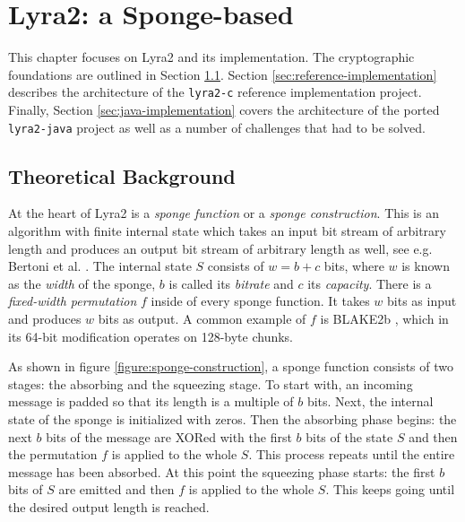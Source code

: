 \chapter{Lyra2: a Sponge-based }
\label{sec:implementation-details}
\label{chapter:lyra2}

This chapter focuses on Lyra2 and its implementation. The cryptographic foundations are outlined in Section \ref{sec:lyra2-brief-description}. Section \ref{sec:reference-implementation} describes the architecture of the \texttt{lyra2-c} reference implementation project. Finally, Section \ref{sec:java-implementation} covers the architecture of the ported \texttt{lyra2-java} project as well as a number of challenges that had to be solved.

\section{Theoretical Background}
\label{sec:lyra2-brief-description}

At the heart of Lyra2 is a \emph{sponge function} or a \emph{sponge construction}. This is an algorithm with finite internal state which takes an input bit stream of arbitrary length and produces an output bit stream of arbitrary length as well, see e.g. Bertoni et al. \cite{bertoni2007sponge}. The internal state \(S\) consists of \(w = b + c\) bits, where \(w\) is known as the \emph{width} of the sponge, \(b\) is called its \emph{bitrate} and \(c\) its \emph{capacity}. There is a \emph{fixed-width permutation} \(f\) inside of every sponge function. It takes \(w\) bits as input and produces \(w\) bits as output. A common example of \(f\) is BLAKE2b \cite{aumasson:2013:blake2}, which in its 64-bit modification operates on 128-byte chunks.

As shown in figure \ref{figure:sponge-construction}, a sponge function consists of two stages: the absorbing and the squeezing stage. To start with, an incoming message is padded so that its length is a multiple of \(b\) bits. Next, the internal state of the sponge is initialized with zeros. Then the absorbing phase begins: the next \(b\) bits of the message are XORed with the first \(b\) bits of the state \(S\) and then the permutation \(f\) is applied to the whole \(S\). This process repeats until the entire message has been absorbed. At this point the squeezing phase starts: the first \(b\) bits of \(S\) are emitted and then \(f\) is applied to the whole \(S\). This keeps going until the desired output length is reached.

